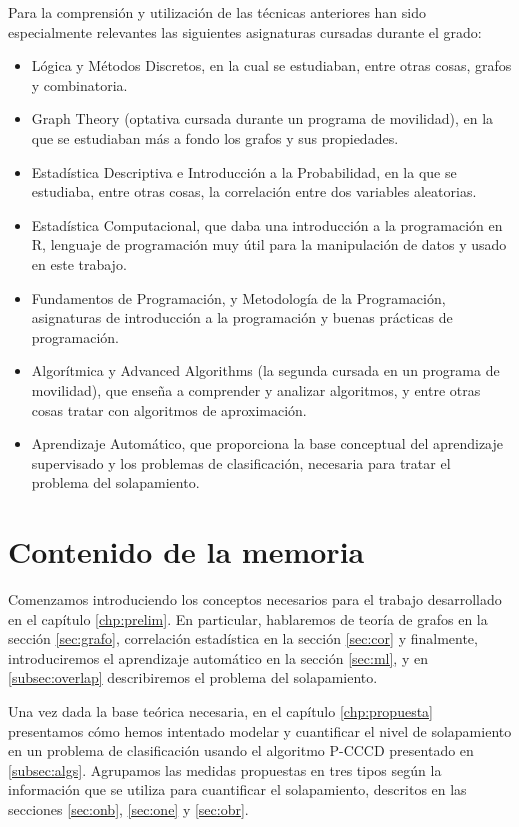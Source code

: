 \documentclass[a4paper,12pt]{report}
\theoremstyle{definition}
\begin{document}
Para la comprensión y utilización de las técnicas anteriores han sido especialmente relevantes las siguientes asignaturas cursadas durante el grado:
\begin{itemize}
\item Lógica y Métodos Discretos, en la cual se estudiaban, entre otras cosas, grafos y combinatoria.
\item Graph Theory (optativa cursada durante un programa de movilidad), en la que se estudiaban más a fondo los grafos y sus propiedades.
\item Estadística Descriptiva e Introducción a la Probabilidad, en la que se estudiaba, entre otras cosas, la correlación entre dos variables aleatorias.
\item Estadística Computacional, que daba una introducción a la programación en R, lenguaje de programación muy útil para la manipulación de datos y usado en este trabajo.
\item Fundamentos de Programación, y Metodología de la Programación, asignaturas de introducción a la programación y buenas prácticas de programación.
\item Algorítmica y Advanced Algorithms (la segunda cursada en un programa de movilidad), que enseña a comprender y analizar algoritmos, y entre otras cosas tratar con algoritmos de aproximación.
\item Aprendizaje Automático, que proporciona la base conceptual del aprendizaje supervisado y los problemas de clasificación, necesaria para tratar el problema del solapamiento.
\end{itemize}


\section{Contenido de la memoria}

Comenzamos introduciendo los conceptos necesarios para el trabajo desarrollado en el capítulo \ref{chp:prelim}. En particular, hablaremos de teoría de grafos en la sección \ref{sec:grafo}, correlación estadística en la sección \ref{sec:cor} y finalmente, introduciremos el aprendizaje automático en la sección \ref{sec:ml}, y en \ref{subsec:overlap} describiremos el problema del solapamiento.

Una vez dada la base teórica necesaria, en el capítulo \ref{chp:propuesta} presentamos cómo hemos intentado modelar y cuantificar el nivel de solapamiento en un problema de clasificación usando el algoritmo P-CCCD presentado en \ref{subsec:algs}. Agrupamos las medidas propuestas en tres tipos según la información que se utiliza para cuantificar el solapamiento, descritos en las secciones \ref{sec:onb}, \ref{sec:one} y \ref{sec:obr}.
\end{document}
